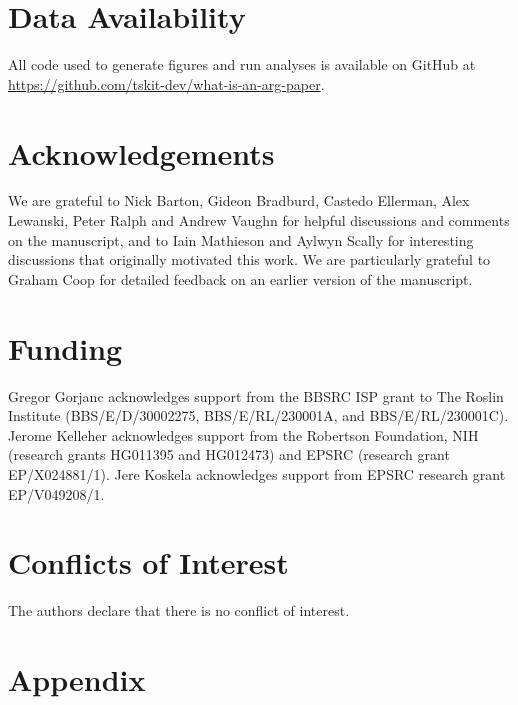 \documentclass[9pt,twocolumn,twoside]{gsajnl}
\begin{document}
\section*{Data Availability}
All code used to generate figures and run analyses is available on GitHub at
\url{https://github.com/tskit-dev/what-is-an-arg-paper}.

\section*{Acknowledgements}
We are grateful to Nick Barton, Gideon Bradburd, 
Castedo Ellerman, Alex Lewanski,
Peter Ralph and Andrew Vaughn
for helpful discussions and comments on the manuscript, and
to Iain Mathieson and Aylwyn Scally for interesting discussions that
originally motivated this work.
We are particularly grateful to Graham Coop for detailed feedback
on an earlier version of the manuscript.

\section*{Funding}
Gregor Gorjanc acknowledges support from the BBSRC ISP grant to The Roslin Institute
(BBS/E/D/30002275, BBS/E/RL/230001A, and BBS/E/RL/230001C).
Jerome Kelleher acknowledges support from the Robertson Foundation,
NIH (research grants HG011395 and HG012473) and
EPSRC (research grant EP/X024881/1).
Jere Koskela acknowledges support from EPSRC research grant EP/V049208/1.

\section*{Conflicts of Interest}
The authors declare that there is no conflict of interest.

% 


\setcounter{secnumdepth}{2} %

\section*{Appendix}
\appendix


\setcounter{table}{0}
\setcounter{figure}{0}
\renewcommand{\thetable}{A\arabic{table}}
\renewcommand{\thefigure}{A\arabic{figure}}
\end{document}
